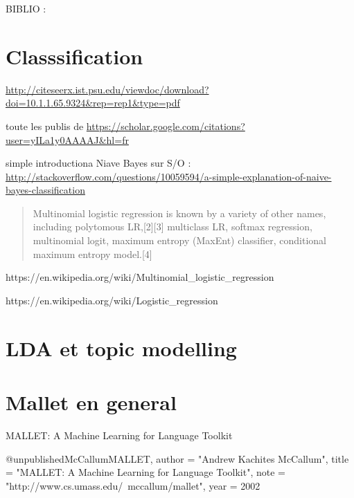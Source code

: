 BIBLIO : 

\section{Classsification }

\item \url{http://citeseerx.ist.psu.edu/viewdoc/download?doi=10.1.1.65.9324&rep=rep1&type=pdf}
\item toute les publis de \url{https://scholar.google.com/citations?user=yILa1y0AAAAJ&hl=fr}
\item simple introductiona  Niave Bayes sur S/O : \url{http://stackoverflow.com/questions/10059594/a-simple-explanation-of-naive-bayes-classification}


\begin{quote}
Multinomial logistic regression is known by a variety of other names, including polytomous LR,[2][3] multiclass LR, softmax regression, multinomial logit, maximum entropy (MaxEnt) classifier, conditional maximum entropy model.[4]
\end{quote}

\item https://en.wikipedia.org/wiki/Multinomial_logistic_regression
\item https://en.wikipedia.org/wiki/Logistic_regression

\section{LDA et topic modelling}


\section{Mallet en general}
MALLET: A Machine Learning for Language Toolkit 

   @unpublished{McCallumMALLET,
      author = "Andrew Kachites McCallum",
      title = "MALLET: A Machine Learning for Language Toolkit",
      note = "http://www.cs.umass.edu/~mccallum/mallet",
      year = 2002}


